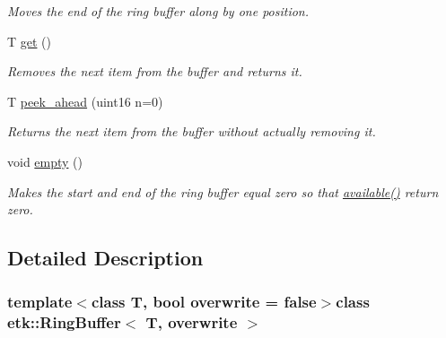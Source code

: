 \begin{DoxyCompactItemize}
\begin{DoxyCompactList}\small\item\em Moves the end of the ring buffer along by one position. \end{DoxyCompactList}\item 
\hypertarget{classetk_1_1_ring_buffer_ac1327e40f6f3914156154e669076f4b8}{T \hyperlink{classetk_1_1_ring_buffer_ac1327e40f6f3914156154e669076f4b8}{get} ()}\label{classetk_1_1_ring_buffer_ac1327e40f6f3914156154e669076f4b8}

\begin{DoxyCompactList}\small\item\em Removes the next item from the buffer and returns it. \end{DoxyCompactList}\item 
\hypertarget{classetk_1_1_ring_buffer_a2b3fdaebee47396cca48e7fab8ef962c}{T \hyperlink{classetk_1_1_ring_buffer_a2b3fdaebee47396cca48e7fab8ef962c}{peek\-\_\-ahead} (uint16 n=0)}\label{classetk_1_1_ring_buffer_a2b3fdaebee47396cca48e7fab8ef962c}

\begin{DoxyCompactList}\small\item\em Returns the next item from the buffer without actually removing it. \end{DoxyCompactList}\item 
\hypertarget{classetk_1_1_ring_buffer_a911dbba377c34fa2d20defd1a0922171}{void \hyperlink{classetk_1_1_ring_buffer_a911dbba377c34fa2d20defd1a0922171}{empty} ()}\label{classetk_1_1_ring_buffer_a911dbba377c34fa2d20defd1a0922171}

\begin{DoxyCompactList}\small\item\em Makes the start and end of the ring buffer equal zero so that \hyperlink{classetk_1_1_ring_buffer_a928acf9be50189de076421563446a0f0}{available()} return zero. \end{DoxyCompactList}\end{DoxyCompactItemize}


\subsection{Detailed Description}
\subsubsection*{template$<$class T, bool overwrite = false$>$class etk\-::\-Ring\-Buffer$<$ T, overwrite $>$}

